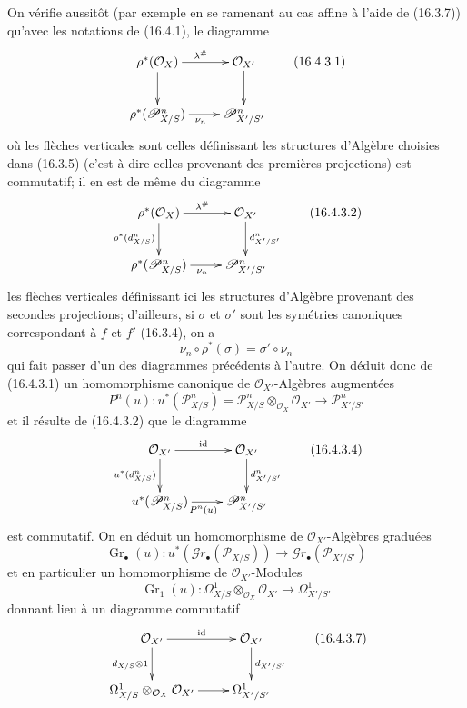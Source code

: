 \begin{env}[16.4.3]
\label{IV.16.4.3}
On vérifie aussitôt (par exemple en se ramenant au cas affine à l'aide de
(16.3.7)) qu'avec les notations de (16.4.1), le diagramme
\[
  \xymatrix{
    \rho^*(\mathcal{O}_X) \ar[r]^{\lambda^\#} \ar[d] &
      \mathcal{O}_{X'} \ar[d] \\
    \rho^*(\mathscr{P}_{X/S}^n) \ar[r]_{\nu_n} &
      \mathscr{P}_{X'/S'}^n
  }
  \tag{16.4.3.1}
  \label{IV.16.4.3.1}
\]
où les flèches verticales sont celles définissant les structures d'Algèbre
choisies dans (16.3.5) (c'est-à-dire celles provenant des premières projections)
est commutatif; il en est de même du diagramme
\[
  \xymatrix{
    \rho^*(\mathcal{O}_X) \ar[r]^{\lambda^\#}
      \ar[d]_{\rho^*(d_{X/S}^n)} &
      \mathcal{O}_{X'} \ar[d]^{d_{X'/S'}^n} \\
    \rho^*(\mathscr{P}_{X/S}^n) \ar[r]_{\nu_n} &
      \mathscr{P}_{X'/S'}^n
  }
  \tag{16.4.3.2}
  \label{IV.16.4.3.2}
\]
les flèches verticales définissant ici les structures d'Algèbre provenant des
secondes projections; d'ailleurs, si $\sigma$ et $\sigma'$ sont les symétries
canoniques correspondant à $f$ et $f'$ (16.3.4), on a
\[
  \nu_n\circ\rho^*(\sigma)=\sigma'\circ\nu_n
\]
qui fait passer d'un des diagrammes précédents à l'autre. On déduit donc de
(16.4.3.1) un homomorphisme canonique de $\mathcal{O}_{X'}$-Algèbres augmentées
\[
  P^n(u):u^*(\mathscr{P}_{X/S}^n)
  =\mathscr{P}_{X/S}^n\otimes_{\mathcal{O}_X}\mathcal{O}_{X'}
  \longrightarrow\mathscr{P}_{X'/S'}^n
  \tag{16.4.3.3}
  \label{IV.16.4.3.3}
\]
et il résulte de (16.4.3.2) que le diagramme
\[
  \xymatrix{
    \mathcal{O}_{X'} \ar[r]^{\operatorname{id}}
      \ar[d]_{u^*(d_{X/S}^n)} &
      \mathcal{O}_{X'} \ar[d]^{d_{X'/S'}^n} \\
    u^*(\mathscr{P}_{X/S}^n) \ar[r]_{P^n(u)} &
      \mathscr{P}_{X'/S'}^n
  }
  \tag{16.4.3.4}
  \label{IV.16.4.3.4}
\]
est commutatif. On en déduit un homomorphisme de $\mathcal{O}_{X'}$-Algèbres
graduées
\[
  \operatorname{Gr}_\bullet(u):u^*(\mathscr{G}r_\bullet(\mathscr{P}_{X/S}))
  \longrightarrow\mathscr{G}r_\bullet(\mathscr{P}_{X'/S'})
  \tag{16.4.3.5}
  \label{IV.16.4.3.5}
\]
et en particulier un homomorphisme de $\mathcal{O}_{X'}$-Modules
\[
  \operatorname{Gr}_1(u):
  \Omega_{X/S}^1\otimes_{\mathcal{O}_X}\mathcal{O}_{X'}
  \longrightarrow\Omega_{X'/S'}^1
  \tag{16.4.3.6}
  \label{IV.16.4.3.6}
\]
donnant lieu à un diagramme commutatif
\[
  \xymatrix{
    \mathcal{O}_{X'} \ar[r]^{\operatorname{id}}
      \ar[d]_{d_{X/S}\otimes 1} &
      \mathcal{O}_{X'} \ar[d]^{d_{X'/S'}} \\
    \Omega_{X/S}^1\otimes_{\mathcal{O}_X}\mathcal{O}_{X'} \ar[r] &
      \Omega_{X'/S'}^1
  }
  \tag{16.4.3.7}
  \label{IV.16.4.3.7}
\]
\end{env}

